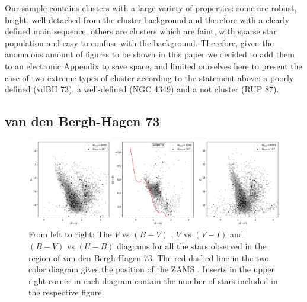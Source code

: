 \documentclass[draft]{aa}
\begin{document}
Our sample contains clusters with a large variety of properties: some are
robust, bright, well detached from the cluster background and therefore with a
clearly defined main sequence, others are clusters which are faint, with sparse
star population and easy to confuse with the background. Therefore, given the
anomalous amount of figures to be shown in this paper we decided to add them to
an electronic Appendix to save space, and limited ourselves here to present the
case of two extreme types of cluster according to the statement above: a poorly
defined (vdBH 73), a well-defined (NGC 4349) and a not cluster 
(RUP 87).


\subsection{van den Bergh-Hagen 73}

\begin{figure}[ht]
    \centering
    \includegraphics[width=\hsize]{../figs/obs_vdBH73.png}
    \caption{From left to right: The $V$ vs $(B-V)$ , $V$ vs $(V-I)$ and
    $(B-V)$ vs $(U-B)$ diagrams for all the stars observed in the region of van
    den Bergh-Hagen 73.
    The red dashed line in the two color diagram gives the position of the ZAMS
    \citep{Aller1982}. Inserts in the upper right corner in each
    diagram contain the number of stars included in the respective figure.}
    \label{fig3}
\end{figure}
\end{document}
